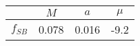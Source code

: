 \begin{tabular}{c||c|c|c}
 & $M$ & $a$ & $\mu$  \\
\hline
$f_{SB}$  & 0.078 & 0.016 & -9.2\\
\end{tabular}

